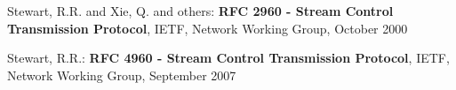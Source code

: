\documentclass[10pt]{article}
\begin{document}
\begin{thebibliography}{9}

 Stewart, R.R. and  Xie, Q. and others:
\textbf{RFC 2960 - Stream Control Transmission Protocol},
IETF, Network Working Group, October 2000

 Stewart, R.R.:
\textbf{RFC 4960 - Stream Control Transmission Protocol},
IETF, Network Working Group, September 2007

\end{thebibliography}
\end{document}
